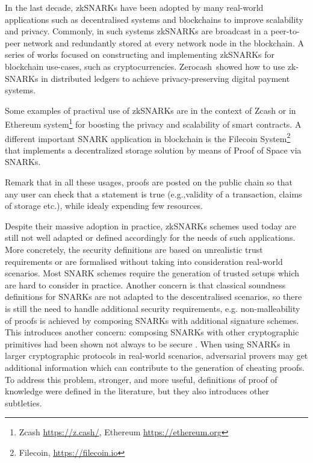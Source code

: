 In the last decade, zkSNARKs have been adopted by many real-world applications such as decentralised systems and blockchains to improve scalability and privacy. 
Commonly, in such systems zkSNARKs are broadcast in a peer-to-peer network and redundantly stored at every network node in the blockchain.
A series of works focused on constructing and implementing zkSNARKs for blockchain use-cases, such as cryptocurrencies. Zerocash~\cite{SP:BCGGMT14}showed how to use zk-SNARKs in distributed ledgers to achieve privacy-preserving digital payment systems. 
  
Some examples of practival use of zkSNARKs are in the context of Zcash or in Ethereum system\footnote{Zcash \url{https://z.cash/}, Ethereum \url{https://ethereum.org}} for boosting the privacy and scalability of smart contracts. 
A different important SNARK application in blockchain is the Filecoin System\footnote{Filecoin,  \url{https://filecoin.io}} that implements a decentralized storage solution by means of Proof of Space via SNARKs. 

Remark that in all these usages, proofs are posted on the public chain so that any user 
can check that a statement is true (e.g.,validity of a transaction, claims of storage etc.), while idealy expending few resources.

Despite their massive adoption in practice,  zkSNARKs schemes used today are still not well adapted or defined accordingly for the needs of such applications. 
More concretely,  the security definitions are based on unrealistic trust requirements or are formalised without taking into consideration real-world scenarios. 
Most SNARK schemes require the generation of trusted setups which are hard to consider in practice.  Another concern is that classical soundness  definitions for SNARKs are not adapted to the descentralised scenarios, so there is still the need to handle additional security requirements, e.g. non-malleability of proofs
 is achieved by composing SNARKs with additional signature schemes.  
This introduces another concern: composing SNARKs with other cryptographic primitives had been shown not always to be secure \cite{STOC:BCPR14,TCC:FioNit16}.
When using SNARKs in larger cryptographic protocols in real-world scenarios, 
adversarial provers
may get additional information which can contribute to the generation of cheating proofs. To address this problem,  stronger, and more useful, definitions
of proof of knowledge were defined in the literature, but they also introduces other
subtleties.

